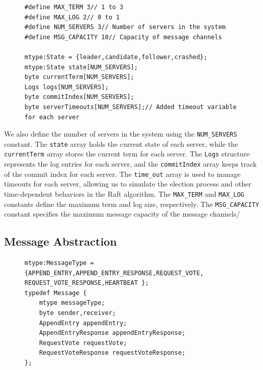 \documentclass[a4paper]{llncs}
\begin{document}
    \begin{figure}[htbp]
        \centering
        \begin{lstlisting}[style=promela, caption={State Declaration}, label={lst:state_declaration}]
#define MAX_TERM 3// 1 to 3
#define MAX_LOG 2// 0 to 1
#define NUM_SERVERS 3// Number of servers in the system
#define MSG_CAPACITY 10// Capacity of message channels
        
mtype:State = {leader,candidate,follower,crashed};
mtype:State state[NUM_SERVERS];
byte currentTerm[NUM_SERVERS];
Logs logs[NUM_SERVERS];
byte commitIndex[NUM_SERVERS];
byte serverTimeouts[NUM_SERVERS];// Added timeout variable for each server

\end{lstlisting}
    \end{figure}
    We also define the number of servers in the system using the \texttt{NUM\_SERVERS}
    constant. The \texttt{state} array holds the current state of each server, while
    the \texttt{currentTerm} array stores the current term for each server. The \texttt{Logs}
    structure represents the log entries for each server, and the \texttt{commitIndex}
    array keeps track of the commit index for each server. The \texttt{time\_out}
    array is used to manage timeouts for each server, allowing us to simulate the
    election process and other time-dependent behaviors in the Raft algorithm.
    The \texttt{MAX\_TERM} and \texttt{MAX\_LOG} constants define the maximum
    term and log size, respectively. The \texttt{MSG\_CAPACITY} constant specifies
    the maximum message capacity of the message channels/

    \subsection{Message Abstraction}
    \label{sec:message_abstraction}

    \begin{figure}[htbp]
        \centering
        \begin{lstlisting}[style=promela, caption={Message Types(1)}]
mtype:MessageType = 
{APPEND_ENTRY,APPEND_ENTRY_RESPONSE,REQUEST_VOTE, REQUEST_VOTE_RESPONSE,HEARTBEAT };
typedef Message {
	mtype messageType;
	byte sender,receiver;
	AppendEntry appendEntry;
	AppendEntryResponse appendEntryResponse;
	RequestVote requestVote;
	RequestVoteResponse requestVoteResponse;
};
\end{lstlisting}
    \end{figure}
\end{document}
